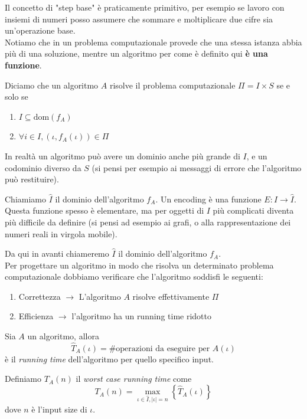 \documentclass[11pt]{scrartcl}
\begin{document}
	Il concetto di "step base" è praticamente primitivo, per esempio se lavoro con insiemi di numeri posso assumere che sommare e moltiplicare due cifre sia un'operazione base. \\
	Notiamo che in un problema computazionale provede che una stessa istanza abbia più di una soluzione, mentre un algoritmo per come è definito qui \textbf{è una funzione}.
	\begin{definition}
		Diciamo che un algoritmo $A$ risolve il problema computazionale $\Pi=I\times S$ se e solo se
		\begin{enumerate}
			\item $I\subseteq\text{dom}(f_A)$
			\item $\forall i\in I,(\iota,f_A(\iota))\in \Pi$
		\end{enumerate}
	\end{definition}
	In realtà un algoritmo può avere un dominio anche più grande di $I$, e un codominio diverso da $S$ (si pensi per esempio ai messaggi di errore che l'algoritmo può restituire).
	\begin{definition}[encoding]
		Chiamiamo $\hat{I}$ il dominio dell'algoritmo $f_A$. Un encoding è una funzione $E:I\to \hat{I}$. Questa funzione spesso è elementare, ma per oggetti di $I$ più complicati diventa più difficile da definire (si pensi ad esempio ai grafi, o alla rappresentazione dei numeri reali in virgola mobile).
	\end{definition}
	Da qui in avanti chiameremo $\hat{I}$ il dominio dell'algoritmo $f_A$. \\
	Per progettare un algoritmo in modo che risolva un determinato problema computazionale dobbiamo verificare che l'algoritmo soddisfi le seguenti:
	\begin{enumerate}
		\item[1)] Correttezza $\to$ L'algoritmo $A$ risolve effettivamente $\Pi$
		\item[2)] Efficienza $\to$ l'algoritmo ha un running time ridotto
	\end{enumerate}
	\begin{definition}
		Sia $A$ un algoritmo, allora $$\hat{T}_A(\iota)=\#\text{operazioni da eseguire per } A(\iota)$$
		è il \textit{running time} dell'algoritmo per quello specifico input.
	\end{definition}
	\begin{definition}
		Definiamo $T_A(n)$ il \textit{worst case running time} come
		$$T_A(n)=\max_{\iota\in \hat{I},|\iota|=n }\left\{\hat{T}_A(\iota)\right\}$$
		dove $n$ è l'input size di $\iota$.
	\end{definition}
\end{document}
